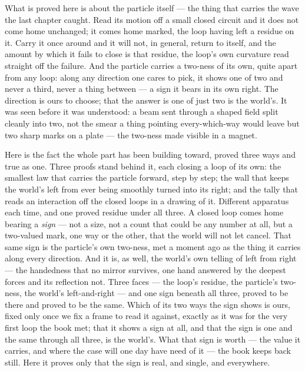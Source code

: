 What is proved here is about the particle itself --- the thing that carries the wave the last chapter caught.
Read its motion off a small closed circuit and it does not come home unchanged; it comes home marked, the loop
having left a residue on it. Carry it once around and it will not, in general, return to itself, and the amount
by which it fails to close is that residue, the loop's own curvature read straight off the failure. And the
particle carries a two-ness of its own, quite apart from any loop: along any direction one cares to pick, it
shows one of two and never a third, never a thing between --- a sign it bears in its own right. The direction is
ours to choose; that the answer is one of just two is the world's. It was seen before it was understood: a beam
sent through a shaped field split cleanly into two, not the smear a thing pointing every-which-way would leave
but two sharp marks on a plate --- the two-ness made visible in a magnet.

Here is the fact the whole part has been building toward, proved three ways and true as one. Three proofs stand
behind it, each closing a loop of its own: the smallest law that carries the particle forward, step by step; the
wall that keeps the world's left from ever being smoothly turned into its right; and the tally that reads an
interaction off the closed loops in a drawing of it. Different apparatus each time, and one proved residue under
all three. A closed loop comes
home bearing a \emph{sign} --- not a size, not a count that could be any number at all, but a two-valued mark,
one way or the other, that the world will not let cancel. That same sign is the particle's own two-ness, met a
moment ago as the thing it carries along every direction. And it is, as well, the world's own telling of left
from right --- the handedness that no mirror survives, one hand answered by the deepest forces and its
reflection not. Three faces --- the loop's residue, the particle's two-ness, the world's left-and-right --- and
one sign beneath all three, proved to be there and proved to be the same. Which of its two ways the sign shows
is ours, fixed only once we fix a frame to read it against, exactly as it was for the very first loop the book
met; that it shows a sign at all, and that the sign is one and the same through all three, is the world's. What
that sign is worth --- the value it carries, and where the case will one day have need of it --- the book keeps
back still. Here it proves only that the sign is real, and single, and everywhere.

